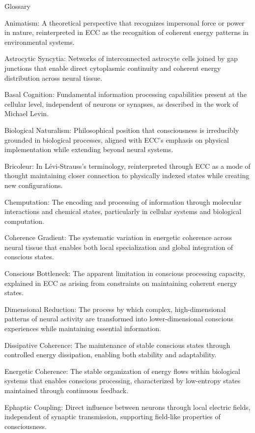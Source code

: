 \h{Glossary}

Animatism: A theoretical perspective that recognizes impersonal force or power in nature, reinterpreted in ECC as the recognition of coherent energy patterns in environmental systems.

Astrocytic Syncytia: Networks of interconnected astrocyte cells joined by gap junctions that enable direct cytoplasmic continuity and coherent energy distribution across neural tissue.

Basal Cognition: Fundamental information processing capabilities present at the cellular level, independent of neurons or synapses, as described in the work of Michael Levin.

Biological Naturalism: Philosophical position that consciousness is irreducibly grounded in biological processes, aligned with ECC's emphasis on physical implementation while extending beyond neural systems.

Bricoleur: In Lévi-Strauss's terminology, reinterpreted through ECC as a mode of thought maintaining closer connection to physically indexed states while creating new configurations.

Chemputation: The encoding and processing of information through molecular interactions and chemical states, particularly in cellular systems and biological computation.

Coherence Gradient: The systematic variation in energetic coherence across neural tissue that enables both local specialization and global integration of conscious states.

Conscious Bottleneck: The apparent limitation in conscious processing capacity, explained in ECC as arising from constraints on maintaining coherent energy states.

Dimensional Reduction: The process by which complex, high-dimensional patterns of neural activity are transformed into lower-dimensional conscious experiences while maintaining essential information.

Dissipative Coherence: The maintenance of stable conscious states through controlled energy dissipation, enabling both stability and adaptability.

Energetic Coherence: The stable organization of energy flows within biological systems that enables conscious processing, characterized by low-entropy states maintained through continuous feedback.

Ephaptic Coupling: Direct influence between neurons through local electric fields, independent of synaptic transmission, supporting field-like properties of consciousness.

